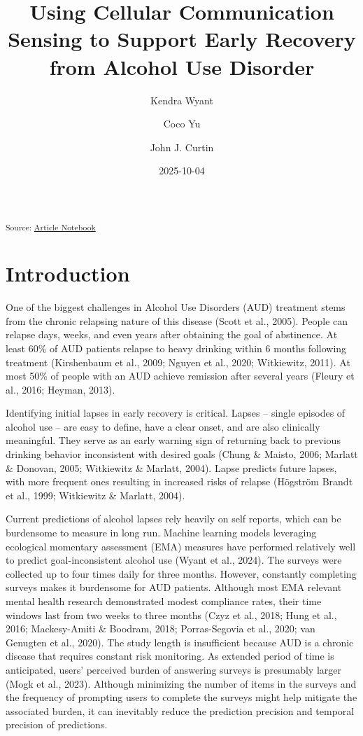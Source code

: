 \documentclass[
  letterpaper,
  DIV=11,
  numbers=noendperiod]{scrartcl}
\title{Using Cellular Communication Sensing to Support Early Recovery
from Alcohol Use Disorder}
\author{Kendra Wyant \and Coco Yu \and John J. Curtin}
\date{2025-10-04}
\begin{document}
\maketitle


\textsubscript{Source:
\href{https://jjcurtin.github.io/study_messages/index.qmd.html}{Article
Notebook}}

\section{Introduction}\label{introduction}

One of the biggest challenges in Alcohol Use Disorders (AUD) treatment
stems from the chronic relapsing nature of this disease (Scott et al.,
2005). People can relapse days, weeks, and even years after obtaining
the goal of abstinence. At least 60\% of AUD patients relapse to heavy
drinking within 6 months following treatment (Kirshenbaum et al., 2009;
Nguyen et al., 2020; Witkiewitz, 2011). At most 50\% of people with an
AUD achieve remission after several years (Fleury et al., 2016; Heyman,
2013).

Identifying initial lapses in early recovery is critical. Lapses --
single episodes of alcohol use -- are easy to define, have a clear
onset, and are also clinically meaningful. They serve as an early
warning sign of returning back to previous drinking behavior
inconsistent with desired goals (Chung \& Maisto, 2006; Marlatt \&
Donovan, 2005; Witkiewitz \& Marlatt, 2004). Lapse predicts future
lapses, with more frequent ones resulting in increased risks of relapse
(Högström Brandt et al., 1999; Witkiewitz \& Marlatt, 2004).

Current predictions of alcohol lapses rely heavily on self reports,
which can be burdensome to measure in long run. Machine learning models
leveraging ecological momentary assessment (EMA) measures have performed
relatively well to predict goal-inconsistent alcohol use (Wyant et al.,
2024). The surveys were collected up to four times daily for three
months. However, constantly completing surveys makes it burdensome for
AUD patients. Although most EMA relevant mental health research
demonstrated modest compliance rates, their time windows last from two
weeks to three months (Czyz et al., 2018; Hung et al., 2016;
Mackesy-Amiti \& Boodram, 2018; Porras-Segovia et al., 2020; van
Genugten et al., 2020). The study length is insufficient because AUD is
a chronic disease that requires constant risk monitoring. As extended
period of time is anticipated, users' perceived burden of answering
surveys is presumably larger (Mogk et al., 2023). Although minimizing
the number of items in the surveys and the frequency of prompting users
to complete the surveys might help mitigate the associated burden, it
can inevitably reduce the prediction precision and temporal precision of
predictions.
\end{document}
